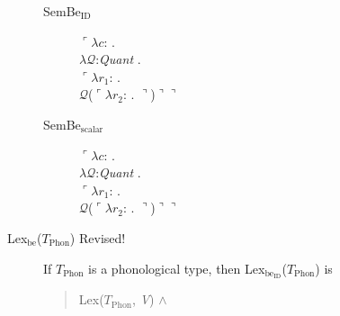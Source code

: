 \begin{description}
\begin{description}
        \item[\textnormal{SemBe$_{\text{ID}}$}] \mbox{}

          $\ulcorner\lambda c$: . \\
        \hspace*{1em}$\lambda\mathcal{Q}$:\textit{Quant} . \\
        \hspace*{2em} $\ulcorner\lambda r_1$:
. \\
\hspace*{3em} $\mathcal{Q}$($\ulcorner\lambda
r_2$:
. $\urcorner$)$\urcorner\urcorner$

\item[\textnormal{SemBe$_{\text{scalar}}$}] \mbox{}

  $\ulcorner\lambda c$: . \\
        \hspace*{1em}$\lambda\mathcal{Q}$:\textit{Quant} . \\
        \hspace*{2em} $\ulcorner\lambda r_1$:
. \\
\hspace*{3em} $\mathcal{Q}$($\ulcorner\lambda
r_2$:
. $\urcorner$)$\urcorner\urcorner$

\end{description}


\item[\textnormal{Lex$_{\mathrm{be}}$($T_{\mathrm{Phon}}$)} Revised!] \mbox{}

  If $T_{\mathrm{Phon}}$ is a phonological type, then
  Lex$_{\mathrm{be}_{\text{ID}}}$($T_{\mathrm{Phon}}$) is
\begin{quote}
  Lex($T_{\mathrm{Phon}}$,
\textit{V}) \d{$\wedge$}
\end{quote}


\end{description}

